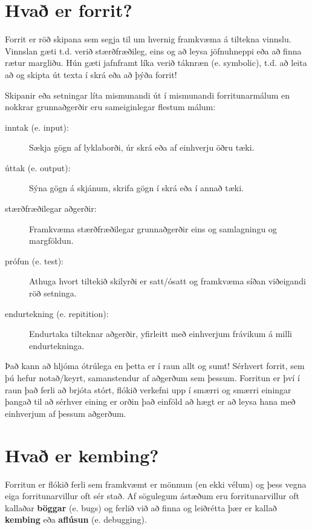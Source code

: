 \section{Hvað er forrit?}

Forrit er röð skipana sem segja til um hvernig framkvæma á tiltekna vinnslu.
Vinnslan gæti t.d. verið stærðfræðileg, eins og að leysa jöfnuhneppi eða að finna rætur margliðu.
Hún gæti jafnframt líka verið táknræn (e. symbolic), t.d. að leita að og skipta út texta í skrá eða að þýða forrit!


Skipanir eða setningar líta mismunandi út í mismunandi forritunarmálum en nokkrar grunnaðgerðir eru sameiginlegar flestum málum:

\begin{description}

\item[inntak (e. input):] Sækja gögn af lyklaborði, úr skrá eða af einhverju öðru tæki.

\item[úttak (e. output):] Sýna gögn á skjánum, skrifa gögn í skrá eða í annað tæki. 

\item[stærðfræðilegar aðgerðir:] Framkvæma stærðfræðilegar grunnaðgerðir eins og samlagningu og margföldun.

\item[prófun (e. test):] Athuga hvort tiltekið skilyrði er satt/ósatt og framkvæma síðan viðeigandi röð setninga.

\item[endurtekning (e. repitition):] Endurtaka tilteknar aðgerðir, yfirleitt með einhverjum frávikum á milli endurtekninga.

\end{description}

Það kann að hljóma ótrúlega en þetta er í raun allt og sumt!
Sérhvert forrit, sem þú hefur notað/keyrt, samanstendur af aðgerðum sem þessum.
Forritun er því í raun það ferli að brjóta stórt, flókið verkefni upp í smærri og smærri einingar þangað til að sérhver eining er orðin það einföld að hægt er að leysa hana með einhverjum af þessum aðgerðum.

\section{Hvað er kembing?}

Forritun er flókið ferli sem framkvæmt er mönnum (en ekki vélum) og þess vegna eiga forritunarvillur oft sér stað.
Af sögulegum ástæðum eru forritunarvillur oft kallaðar {\bf böggar} (e. bugs) og ferlið við að finna og leiðrétta þær er kallað {\bf kembing} eða {\bf aflúsun} (e. debugging).

